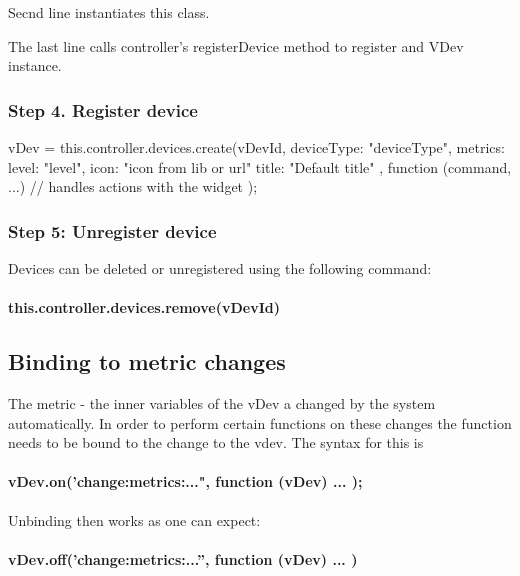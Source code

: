 Secnd line instantiates this class.

The last line calls controller's registerDevice method to register and VDev instance.

\subsubsection{Step 4. Register device}

\begin{listingverbatim}
        vDev = this.controller.devices.create(vDevId, {
            deviceType: "deviceType",
            metrics: {
                level: "level",
                icon: "icon from lib or url"
                title: "Default title"
            }
        }, function (command, ...) {
                // handles actions with the widget
        });  
\end{listingverbatim}

\subsubsection{Step 5: Unregister device}

Devices can be deleted or unregistered  using the following command:

\paragraph{this.controller.devices.remove(vDevId)}

\subsection{Binding to metric changes}

The metric - the inner variables of the vDev a changed by the system automatically.
In order to perform certain functions on these changes the function needs to be 
bound to the change to the vdev. The syntax for this is

\paragraph{vDev.on('change:metrics:...", function (vDev) { ... });}


Unbinding then works as one can expect:

\paragraph{vDev.off(’change:metrics:...”, function (vDev) ... )} 


